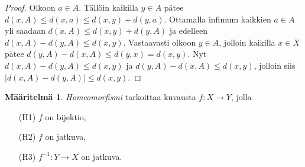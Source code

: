 \documentclass[12pt,a4paper,leqno]{report}
\theoremstyle{plain}
\theoremstyle{definition}
\newtheorem{maar}[equation]{Määritelmä}
\theoremstyle{remark}
\begin{document}
\begin{proof}
Olkoon $a\in A$. Tällöin kaikilla $y\in A$ pätee $d(x,A)\leq d(x,a)\leq d(x,y)+d(y,a)$. Ottamalla infimum kaikkien $a\in A$ yli saadaan $d(x,A)\leq d(x,y)+d(y,A)$
ja edelleen $d(x,A)-d(y,A)\leq d(x,y) $.
Vastaavasti olkoon $y\in A$, jolloin kaikilla $x\in X$ pätee $d(y,A)-d(x,A)\leq d(y,x)=d(x,y) $. Nyt $d(x,A)-d(y,A)\leq d(x,y) $ ja $d(y,A)-d(x,A)\leq d(x,y) $, jolloin siis $|d(x,A)-d(y,A)|\leq d(x,y) $.

\end{proof}

\begin{maar} \emph{Homeomorfismi} 
tarkoittaa kuvausta $f\colon X\rightarrow Y$, jolla 
\begin{itemize}
\item[(H1)] $f$ on bijektio,
\item[(H2)] $f$ on jatkuva,
\item[(H3)] $f^{-1} \colon Y\rightarrow X$ on jatkuva. 
\end{itemize}
\end{maar}
\end{document}
